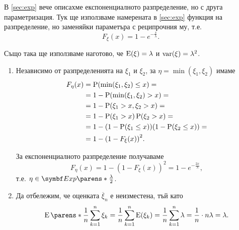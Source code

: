 \documentclass{../../common/topic}
\begin{document}
\begin{solution}
  В \cref{sec:exp} вече описахме експоненциалното разпределение, но с друга параметризация. Тук ще използваме намерената в \cref{sec:exp} функция на разпределение, но заменяйки параметъра с реципрочния му, т.е.
  \begin{equation*}
    F_\xi(x) = 1 - e^{-\frac x \lambda}.
  \end{equation*}

  Също така ще използваме наготово, че \( \operatorname{E}(\xi) = \lambda \) и \( \operatorname{var}(\xi) = \lambda^2 \).

  \begin{enumerate}[label=\alph*)]
    \item Независимо от разпределенията на \( \xi_1 \) и \( \xi_2 \), за \( \eta = \min(\xi_1, \xi_2) \) имаме
    \begin{align*}
      F_\eta(x)
      &=
      \operatorname{P}(\min(\xi_1, \xi_2) \leq x)
      = \\ &=
      1 - \operatorname{P}(\min(\xi_1, \xi_2) > x)
      = \\ &=
      1 - \operatorname{P}(\xi_1 > x, \xi_2 > x)
      = \\ &=
      1 - \operatorname{P}(\xi_1 > x) \operatorname{P}(\xi_2 > x)
      = \\ &=
      1 - (1 - \operatorname{P}(\xi_1 \leq x)) (1 - \operatorname{P}(\xi_2 \leq x))
      = \\ &=
      1 - {(1 - F_\xi(x))}^2.
    \end{align*}

    За експоненциалното разпределение получаваме
    \begin{equation*}
      F_\eta(x)
      =
      1 - {(1 - F_\xi(x))}^2
      =
      1 - e^{- \frac {2 x} \lambda},
    \end{equation*}
    т.е. \( \eta \in \distr{Exp}\parens*{\frac \lambda 2 } \).

    \item Да отбележим, че оценката \( \overline \xi_n \) е неизместена, тъй като
    \begin{equation*}
      \Expect\parens*{ \frac 1 n \sum_{k=1}^n \xi_k }
      =
      \frac 1 n \sum_{k=1}^n \Expect(\xi_k)
      =
      \frac 1 n \sum_{k=1}^n \lambda
      =
      \frac 1 n \cdot n \lambda
      =
      \lambda.
    \end{equation*}


\end{enumerate}
\end{solution}
\end{document}
